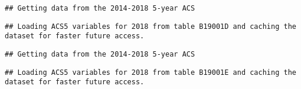 \documentclass[]{article}
\newenvironment{Shaded}{\begin{snugshade}}{\end{snugshade}}
\newcommand{\DataTypeTok}[1]{\textcolor[rgb]{0.13,0.29,0.53}{#1}}
\newcommand{\DecValTok}[1]{\textcolor[rgb]{0.00,0.00,0.81}{#1}}
\newcommand{\KeywordTok}[1]{\textcolor[rgb]{0.13,0.29,0.53}{\textbf{#1}}}
\newcommand{\NormalTok}[1]{#1}
\newcommand{\OperatorTok}[1]{\textcolor[rgb]{0.81,0.36,0.00}{\textbf{#1}}}
\newcommand{\OtherTok}[1]{\textcolor[rgb]{0.56,0.35,0.01}{#1}}
\newcommand{\StringTok}[1]{\textcolor[rgb]{0.31,0.60,0.02}{#1}}
\begin{document}
\begin{verbatim}
## Getting data from the 2014-2018 5-year ACS
\end{verbatim}

\begin{verbatim}
## Loading ACS5 variables for 2018 from table B19001D and caching the dataset for faster future access.
\end{verbatim}

\begin{Shaded}
\end{Shaded}

\begin{verbatim}
## Getting data from the 2014-2018 5-year ACS
\end{verbatim}

\begin{verbatim}
## Loading ACS5 variables for 2018 from table B19001E and caching the dataset for faster future access.
\end{verbatim}

\begin{Shaded}
\end{Shaded}
\end{document}
